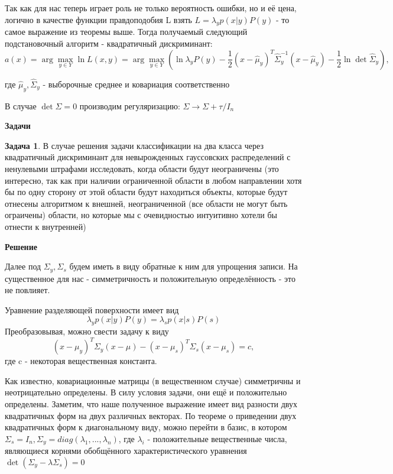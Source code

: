 Так как для нас теперь играет роль не только вероятность ошибки, но и её цена, логично в качестве функции правдоподобия L взять $ L = \lambda_y p(x|y) P(y)$ - то самое выражение из теоремы выше. Тогда получаемый следующий подстановочный алгоритм - квадратичный дискриминант:
\[a(x) = \arg \max_{y \in Y} \ln L(x, y) = \arg \max_{y \in Y} (\ln \lambda_{y}P(y) - \frac{1}{2}(x-\hat\mu_y)^{T}\hat\Sigma_{y}^{-1}(x-\hat\mu_y) - \frac{1}{2}\ln \det\hat\Sigma_y),\]

где $\hat\mu_y, \hat\Sigma_y$ - выборочные среднее и ковариация соответственно

В случае $\det \Sigma = 0$ производим регуляризацию: $\Sigma \longrightarrow \Sigma + \tau/ I_{n}$

\textbf{Задачи}

\textbf{Задача 1}. В случае решения задачи классификации на два класса через квадратичный дискриминант для невырожденных гауссовских распределений с ненулевыми штрафами исследовать, когда области будут неограничены (это интересно, так как при наличии ограниченной области в любом направлении хотя бы по одну сторону от этой области будут находиться объекты, которые будут отнесены алгоритмом к внешней, неограниченной (все области не могут быть ограичены) области, но которые мы с очевидностью интуитивно хотели бы отнести к внутренней)

\textbf{Решение}

Далее под $\Sigma_y, \Sigma_s$ будем иметь в виду обратные к ним для упрощения записи. На существенное для нас - симметричность и положительную определённость - это не повлияет.

Уравнение разделяющей поверхности имеет вид \[\lambda_y p(x|y) P(y) = \lambda_s p(x|s) P(s)\] Преобразовывая, можно свести задачу к виду \[(x-\mu_{y})^{T}\Sigma_{y}(x-\mu) - (x-\mu_{s})^{T}\Sigma_{s}(x-\mu_{s}) = c,\] где c - некоторая вещественная константа.

Как известно, ковариационные матрицы (в вещественном случае) симметричны и неотрицательно определены. В силу условия задачи, они ещё и положительно определены. Заметим, что наше полученное выражение имеет вид разности двух квадратичных форм на двух различных векторах. По теореме о приведении двух квадратичных форм к диагональному виду, можно перейти в базис, в котором $\Sigma_{s} = I_{n}, \Sigma_{y} = diag(\lambda_{1}, ..., \lambda_{n})$, где $\lambda_{i}$ - положительные вещественные числа, являющиеся корнями обобщённого характеристического уравнения $\det(\Sigma_{y} - \lambda\Sigma_{s}) = 0$

